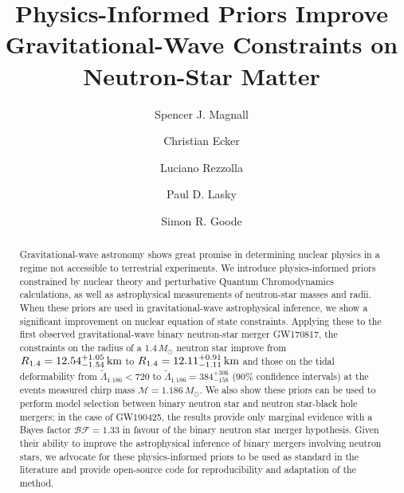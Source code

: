 \documentclass[twocolumn,linenumbers]{aastex631}
\begin{document}
	
\title{Physics-Informed Priors Improve Gravitational-Wave Constraints on
  Neutron-Star Matter}


\author[0009-0000-7037-1809]{Spencer J. Magnall}

\author[0000-0002-8669-4300]{Christian Ecker}

\author[0000-0002-1330-7103]{Luciano Rezzolla}

\author[0000-0003-3763-1386]{Paul D. Lasky}


\author[0000-0002-9575-5152]{Simon R. Goode}


\begin{abstract}
 Gravitational-wave astronomy shows great promise in determining nuclear
 physics in a regime not accessible to terrestrial experiments. We
 introduce physics-informed priors constrained by nuclear theory and
 perturbative Quantum Chromodynamics calculations, as well as
 astrophysical measurements of neutron-star masses and radii. When these
 priors are used in gravitational-wave astrophysical inference, we show a
 significant improvement on nuclear equation of state constraints.
 Applying these to the first observed gravitational-wave binary
 neutron-star merger GW170817, the constraints on the radius of a
 $1.4\,M_\odot$ neutron star improve from $R_{1.4} =
 {12.54^{+1.05}_{-1.54}} \, {\rm km}$ to $R_{1.4} = 12.11^{+0.91}_{-1.11}
 \,{\rm km}$ and those on the tidal deformability from
 $\tilde{\Lambda}_{1.186} < 720$ to $\tilde{\Lambda}_{1.186} =
 384^{+306}_{-158}$ ($90\%$ confidence intervals) at the events measured
 chirp mass $\mathcal{M}=1.186\,M_\odot$. We also show these priors can
 be used to perform model selection between binary neutron star and
 neutron star-black hole mergers; in the case of GW190425, the results
 provide only marginal evidence with a Bayes factor $\mathcal{BF}=1.33$
 in favour of the binary neutron star merger hypothesis. Given their
 ability to improve the astrophysical inference of binary mergers involving
 neutron stars, we advocate for these physics-informed priors to be used
 as standard in the literature and provide open-source code for
 reproducibility and adaptation of the method.
\end{abstract}
	
\end{document}

